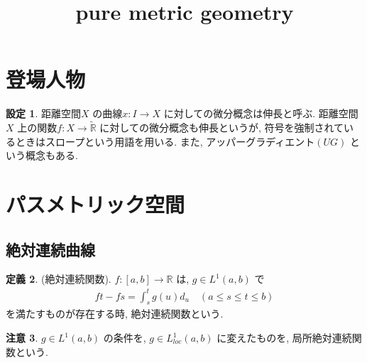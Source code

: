\documentclass[10pt, fleqn, label-section=none]{bxjsarticle}
\title{pure metric geometry}
\date{}
\author{}
\theoremstyle{definition}
\newtheorem{dfn}{定義}[section]
\newtheorem{setting}[dfn]{設定}
\newtheorem{remark}[dfn]{注意}
\renewcommand{\;}{\, ; \,}
\begin{document}
\maketitle


\section{登場人物}

\begin{setting}
距離空間$X$ の曲線$x: I \rightarrow X$ に対しての微分概念は伸長と呼ぶ. 距離空間$X$ 上の関数$f: X \rightarrow \tilde {\mathbb R}$ に対しての微分概念も伸長というが, 符号を強制されているときはスロープという用語を用いる. また, アッパーグラディエント$(UG)$ という概念もある.  
\end{setting}



\section{パスメトリック空間}



\subsection{絶対連続曲線}

\begin{dfn}(絶対連続関数). $f: [a,b] \rightarrow \mathbb R$ は, $ g \in L^1 (a,b)$ で
\begin{align*} ft - fs = \int_s^t g(u) d_u \quad (a \leq s \leq t \leq b) \end{align*}
を満たすものが存在する時, 絶対連続関数という.
\end{dfn}

\begin{remark}
$g \in L^1(a,b)$ の条件を, $g \in L^1_{loc} (a, b)$ に変えたものを, 局所絶対連続関数という. 
\end{remark}
\end{document}
